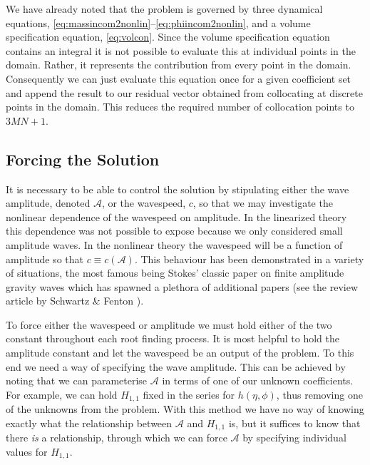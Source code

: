 We have already noted that the problem is governed by three dynamical equations, \eqref{eq:massincom2nonlin}--\eqref{eq:phiincom2nonlin}, and a volume specification equation, \eqref{eq:volcon}. Since the volume specification equation contains an integral it is not possible to evaluate this at individual points in the domain. Rather, it represents the contribution from every point in the domain. Consequently we can just evaluate this equation once for a given coefficient set and append the result to our residual vector obtained from collocating at discrete points in the domain. This reduces the required number of collocation points to $3MN+1$.

\subsection{Forcing the Solution}

It is necessary to be able to control the solution by stipulating either the wave amplitude, denoted $\mathcal{A}$, or the wavespeed, $c$, so that we may investigate the nonlinear dependence of the wavespeed on amplitude. In the linearized theory this dependence was not possible to expose because we only considered small amplitude waves. In the nonlinear theory the wavespeed will be a function of amplitude so that $c\equiv c(\mathcal{A})$. This behaviour has been demonstrated in a variety of situations, the most famous being Stokes'\cite{Stokes:TOW} classic paper on finite amplitude gravity waves which has spawned a plethora of additional papers (see the review article by Schwartz \& Fenton \cite{Schwartz:SNW}). 

To force either the wavespeed or amplitude we must hold either of the two constant throughout each root finding process. It is most helpful to hold the amplitude constant and let the wavespeed be an output of the problem. To this end we need a way of specifying the wave amplitude. This can be achieved by noting that we can parameterise $\mathcal{A}$ in terms of one of our unknown coefficients. For example, we can hold $H_{1,1}$ fixed in the series for $h(\eta,\phi)$, thus removing one of the unknowns from the problem. With this method we have no way of knowing exactly what the relationship between $\mathcal{A}$ and $H_{1,1}$ is, but it suffices to know that there {\em is} a relationship, through which we can force $\mathcal{A}$ by specifying individual values for $H_{1,1}$.

